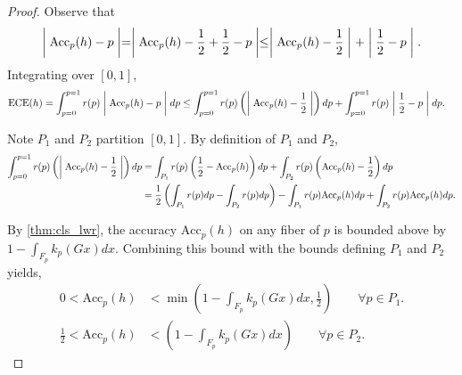 \documentclass[10pt]{article} %
\theoremstyle{definition}
\newcommand{\ECE}{\mathrm{ECE}(h)}
\newcommand{\Acc}{\mathrm{Acc}_p(h)}
\begin{document}
\begin{proof}
    
Observe that
\[
\biggm|\Acc - p\biggm| = \biggm|\Acc - \frac{1}{2} + \frac{1}{2} - p\biggm|   \leq \biggm|\Acc - \frac{1}{2}\biggm| + \biggm|\frac{1}{2} - p\biggm|.\]
Integrating over $[0,1]$,
\begin{align*}
\ECE = \int_{p = 0}^{p=1} r(p) \biggm|\Acc - p\biggm| dp
&\leq \int_{p = 0}^{p=1} r(p) \left(\biggm|\Acc - \frac{1}{2}\biggm| \right)dp + \int_{p=0}^{p=1}r(p)\biggm|\frac{1}{2} - p\biggm|dp.
\end{align*}

 Note $P_1$ and $P_2$ partition $[0,1]$.  By definition of $P_1$ and $P_2$,
\begin{align}
\int_{p = 0}^{p=1} r(p) \left(\biggm|\Acc - \frac{1}{2}\biggm| \right)dp &= \int_{P_1}r(p)\left(\frac{1}{2} - \Acc \right)dp + \int_{P_2}r(p)\left(\Acc - \frac{1}{2}\right)dp \label{eq:first_int}\\
&= \frac{1}{2}\left(\int_{P_1}r(p)dp - \int_{P_2}r(p)dp\right) - \int_{P_1} r(p) \Acc dp + \int_{P_2}r(p)\Acc dp. \label{eq:second_int}
\end{align}


By \cref{thm:cls_lwr}, the accuracy $\Acc$ on any fiber of $p$ is bounded above by $1 - \int_{F_p}k_p(Gx) dx$. Combining this bound with the bounds defining $P_1$ and $P_2$ yields,
\begin{align*}
0 < \Acc &< \min\left(1 - \int_{F_p}k_p(Gx) dx,\frac{1}{2}\right) \qquad \forall p \in P_1.\\
\frac{1}{2} < \Acc &< \left(1 - \int_{F_p}k_p(Gx) dx\right) \qquad \forall p \in P_2.
\end{align*}


\end{proof}
\end{document}
